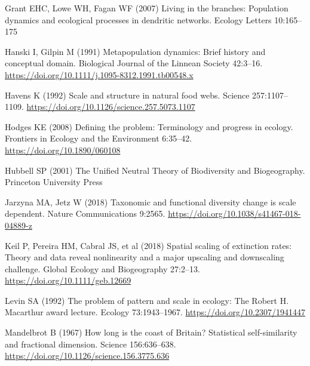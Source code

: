 \documentclass[
  12pt,
]{article}
\newlength{\cslhangindent}
\newlength{\cslentryspacingunit} %
\newenvironment{CSLReferences}[2] %
 {%
  \setlength{\parindent}{0pt}
  \ifodd #1
  \let\oldpar\par
  \def\par{\hangindent=\cslhangindent\oldpar}
  \fi
  \setlength{\parskip}{#2\cslentryspacingunit}
 }%
 {}
\begin{document}
\begin{CSLReferences}{1}{0}
\leavevmode{}%
Grant EHC, Lowe WH, Fagan WF (2007) Living in the branches: Population dynamics and ecological processes in dendritic networks. Ecology Letters 10:165--175

\leavevmode{}%
Hanski I, Gilpin M (1991) Metapopulation dynamics: Brief history and conceptual domain. Biological Journal of the Linnean Society 42:3--16. \url{https://doi.org/10.1111/j.1095-8312.1991.tb00548.x}

\leavevmode{}%
Havens K (1992) Scale and structure in natural food webs. Science 257:1107--1109. \url{https://doi.org/10.1126/science.257.5073.1107}

\leavevmode{}%
Hodges KE (2008) Defining the problem: Terminology and progress in ecology. Frontiers in Ecology and the Environment 6:35--42. \url{https://doi.org/10.1890/060108}

\leavevmode{}%
Hubbell SP (2001) The {Unified Neutral Theory} of {Biodiversity} and {Biogeography}. {Princeton University Press}

\leavevmode{}%
Jarzyna MA, Jetz W (2018) Taxonomic and functional diversity change is scale dependent. Nature Communications 9:2565. \url{https://doi.org/10.1038/s41467-018-04889-z}

\leavevmode{}%
Keil P, Pereira HM, Cabral JS, et al (2018) Spatial scaling of extinction rates: {Theory} and data reveal nonlinearity and a major upscaling and downscaling challenge. Global Ecology and Biogeography 27:2--13. \url{https://doi.org/10.1111/geb.12669}

\leavevmode{}%
Levin SA (1992) The problem of pattern and scale in ecology: The {Robert H}. {Macarthur} award lecture. Ecology 73:1943--1967. \url{https://doi.org/10.2307/1941447}

\leavevmode{}%
Mandelbrot B (1967) How long is the coast of {Britain}? {Statistical} self-similarity and fractional dimension. Science 156:636--638. \url{https://doi.org/10.1126/science.156.3775.636}


\end{CSLReferences}
\end{document}
